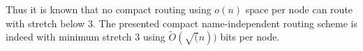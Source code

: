 
Thus it is known that no compact routing using $o(n)$ space per node can route with stretch below 3. The presented compact name-independent routing scheme is indeed with minimum stretch 3 using $\tilde{O}(\sqrt(n))$ bits per node.